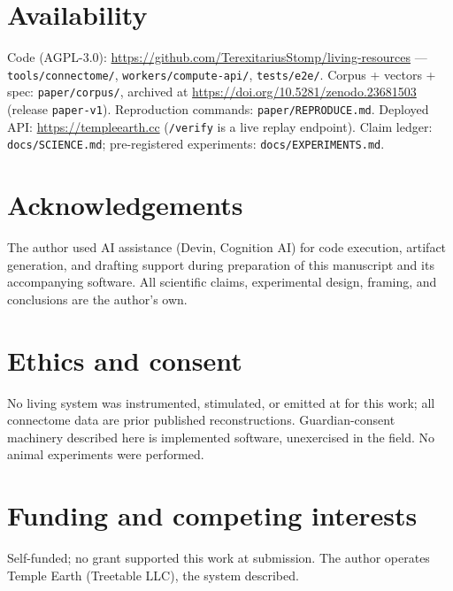 \documentclass[pdflatex,sn-basic]{sn-jnl}
\begin{document}
\section{Availability}
Code (AGPL-3.0): \url{https://github.com/TerexitariusStomp/living-resources}
--- \texttt{tools/connectome/}, \texttt{workers/compute-api/},
\texttt{tests/e2e/}. Corpus + vectors + spec: \texttt{paper/corpus/},
archived at \url{https://doi.org/10.5281/zenodo.23681503} (release
\texttt{paper-v1}).
Reproduction commands: \texttt{paper/REPRODUCE.md}. Deployed API:
\url{https://templeearth.cc} (\texttt{/verify} is a live replay
endpoint). Claim ledger: \texttt{docs/SCIENCE.md};
pre-registered experiments: \texttt{docs/EXPERIMENTS.md}.

\section*{Acknowledgements}
The author used AI assistance (Devin, Cognition AI) for code
execution, artifact generation, and drafting support during
preparation of this manuscript and its accompanying software.
All scientific claims, experimental design, framing, and
conclusions are the author's own.

\section*{Ethics and consent}
No living system was instrumented, stimulated, or emitted at for this
work; all connectome data are prior published reconstructions.
Guardian-consent machinery described here is implemented software,
unexercised in the field. No animal experiments were performed.

\section*{Funding and competing interests}
Self-funded; no grant supported this work at submission. The author
operates Temple Earth (Treetable LLC), the system described.
\end{document}
